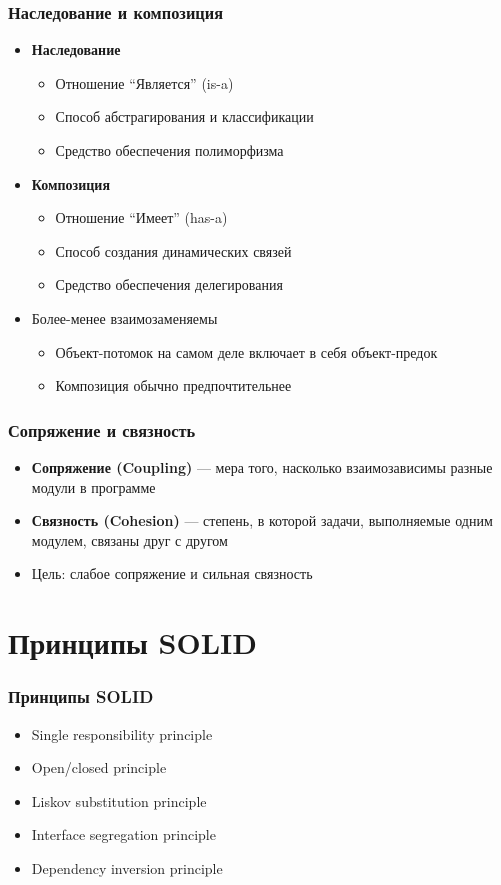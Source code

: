 \documentclass[xetex,mathserif,serif]{beamer}
\begin{document}
	\begin{frame}
		\frametitle{Наследование и композиция}
		\begin{itemize}
			\item \textbf{Наследование}
			\begin{itemize}
				\item Отношение ``Является'' (is-a)
				\item Способ абстрагирования и классификации
				\item Средство обеспечения полиморфизма
			\end{itemize}
			\item \textbf{Композиция}
			\begin{itemize}
				\item Отношение ``Имеет'' (has-a)
				\item Способ создания динамических связей
				\item Средство обеспечения делегирования
			\end{itemize}
			\item Более-менее взаимозаменяемы
			\begin{itemize}
				\item Объект-потомок на самом деле включает в себя объект-предок
				\item Композиция обычно предпочтительнее
			\end{itemize}
		\end{itemize}
	\end{frame}

	\begin{frame}
		\frametitle{Сопряжение и связность}
		\begin{itemize}
			\item \textbf{Сопряжение (Coupling)} --- мера того, насколько взаимозависимы разные модули в программе
			\item \textbf{Связность (Cohesion)} --- степень, в которой задачи, выполняемые одним модулем, связаны друг с другом
			\item Цель: слабое сопряжение и сильная связность
		\end{itemize}
	\end{frame}

	\section{Принципы SOLID}

	\begin{frame}
		\frametitle{Принципы SOLID}
		\begin{itemize}
			\item Single responsibility principle
			\item Open/closed principle
			\item Liskov substitution principle
			\item Interface segregation principle
			\item Dependency inversion principle
		\end{itemize}
	\end{frame}
\end{document}
